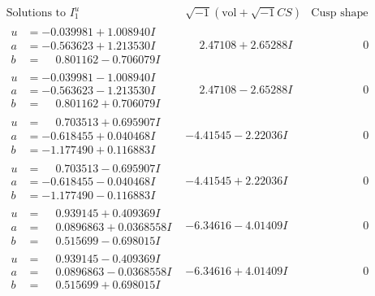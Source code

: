 \documentclass[1p]{elsarticle_modified}
\theoremstyle{definition}
\newcommand{\I}{\sqrt{-1}}
\begin{document}
$$\begin{array}{c|c|c}  
\text{Solutions to }I^u_{1}& \I (\text{vol} + \sqrt{-1}CS) & \text{Cusp shape}\\
 \hline 
\begin{aligned}
u &= -0.039981 + 1.008940 I \\
a &= -0.563623 + 1.213530 I \\
b &= \phantom{-}0.801162 - 0.706079 I\end{aligned}
 & \phantom{-}2.47108 + 2.65288 I & \phantom{-0.000000 } 0 \\ \hline\begin{aligned}
u &= -0.039981 - 1.008940 I \\
a &= -0.563623 - 1.213530 I \\
b &= \phantom{-}0.801162 + 0.706079 I\end{aligned}
 & \phantom{-}2.47108 - 2.65288 I & \phantom{-0.000000 } 0 \\ \hline\begin{aligned}
u &= \phantom{-}0.703513 + 0.695907 I \\
a &= -0.618455 + 0.040468 I \\
b &= -1.177490 + 0.116883 I\end{aligned}
 & -4.41545 - 2.22036 I & \phantom{-0.000000 } 0 \\ \hline\begin{aligned}
u &= \phantom{-}0.703513 - 0.695907 I \\
a &= -0.618455 - 0.040468 I \\
b &= -1.177490 - 0.116883 I\end{aligned}
 & -4.41545 + 2.22036 I & \phantom{-0.000000 } 0 \\ \hline\begin{aligned}
u &= \phantom{-}0.939145 + 0.409369 I \\
a &= \phantom{-}0.0896863 + 0.0368558 I \\
b &= \phantom{-}0.515699 - 0.698015 I\end{aligned}
 & -6.34616 - 4.01409 I & \phantom{-0.000000 } 0 \\ \hline\begin{aligned}
u &= \phantom{-}0.939145 - 0.409369 I \\
a &= \phantom{-}0.0896863 - 0.0368558 I \\
b &= \phantom{-}0.515699 + 0.698015 I\end{aligned}
 & -6.34616 + 4.01409 I & \phantom{-0.000000 } 0 \\ \hline\begin{aligned}

\end{aligned}
\end{array}$$
\end{document}
